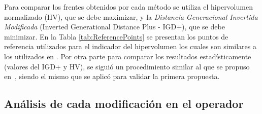 Para comparar los frentes obtenidos por cada método se utiliza el hipervolumen normalizado (HV), 
que se debe maximizar, 
y la \textit{Distancia Generacional Invertida Modificada} (Inverted Generational Distance Plus - IGD+), que se
debe minimizar.
%
En la Tabla \ref{tab:ReferencePoints} se presentan los puntos de referencia utilizados para el indicador del hipervolumen los cuales son similares 
a los utilizados en \cite{Joel:Kuhn_Munkres, Joel:OperatorAHX}.
%
Por otra parte para comparar los resultados estadísticamente (valores del IGD+ y HV), se siguió un procedimiento similar al que se propuso en~\cite{Joel:StatisticalTest},
siendo el mismo que se aplicó para validar la primera propuesta.
%
%
%
%
%
%
%
%


\subsection{Análisis de cada modificación en el operador \SBX{}}

